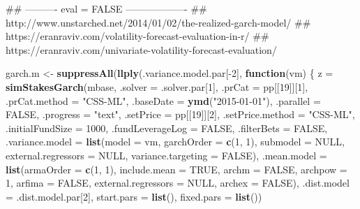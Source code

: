 \documentclass[]{tufte-book}
\newenvironment{Shaded}{}{}
\newcommand{\KeywordTok}[1]{\textcolor[rgb]{0.00,0.44,0.13}{\textbf{#1}}}
\newcommand{\DataTypeTok}[1]{\textcolor[rgb]{0.56,0.13,0.00}{#1}}
\newcommand{\DecValTok}[1]{\textcolor[rgb]{0.25,0.63,0.44}{#1}}
\newcommand{\StringTok}[1]{\textcolor[rgb]{0.25,0.44,0.63}{#1}}
\newcommand{\OtherTok}[1]{\textcolor[rgb]{0.00,0.44,0.13}{#1}}
\newcommand{\ControlFlowTok}[1]{\textcolor[rgb]{0.00,0.44,0.13}{\textbf{#1}}}
\newcommand{\OperatorTok}[1]{\textcolor[rgb]{0.40,0.40,0.40}{#1}}
\newcommand{\NormalTok}[1]{#1}
\begin{document}
\begin{Shaded}
\begin{Highlighting}[]
\NormalTok{## ---------- eval = FALSE -------------------}
\NormalTok{## http://www.unstarched.net/2014/01/02/the-realized-garch-model/}
\NormalTok{## https://eranraviv.com/volatility-forecast-evaluation-in-r/}
\NormalTok{## https://eranraviv.com/univariate-volatility-forecast-evaluation/}

\NormalTok{garch.m <-}\StringTok{ }\KeywordTok{suppressAll}\NormalTok{(}\KeywordTok{llply}\NormalTok{(.variance.model.par[}\OperatorTok{-}\DecValTok{2}\NormalTok{], }
    \ControlFlowTok{function}\NormalTok{(vm) \{}
\NormalTok{        z =}\StringTok{ }\KeywordTok{simStakesGarch}\NormalTok{(mbase, }\DataTypeTok{.solver =}\NormalTok{ .solver.par[}\DecValTok{1}\NormalTok{], }
            \DataTypeTok{.prCat =}\NormalTok{ pp[[}\DecValTok{19}\NormalTok{]][}\DecValTok{1}\NormalTok{], }\DataTypeTok{.prCat.method =} \StringTok{"CSS-ML"}\NormalTok{, }
            \DataTypeTok{.baseDate =} \KeywordTok{ymd}\NormalTok{(}\StringTok{"2015-01-01"}\NormalTok{), }\DataTypeTok{.parallel =} \OtherTok{FALSE}\NormalTok{, }
            \DataTypeTok{.progress =} \StringTok{"text"}\NormalTok{, }\DataTypeTok{.setPrice =}\NormalTok{ pp[[}\DecValTok{19}\NormalTok{]][}\DecValTok{2}\NormalTok{], }
            \DataTypeTok{.setPrice.method =} \StringTok{"CSS-ML"}\NormalTok{, }\DataTypeTok{.initialFundSize =} \DecValTok{1000}\NormalTok{, }
            \DataTypeTok{.fundLeverageLog =} \OtherTok{FALSE}\NormalTok{, }\DataTypeTok{.filterBets =} \OtherTok{FALSE}\NormalTok{, }
            \DataTypeTok{.variance.model =} \KeywordTok{list}\NormalTok{(}\DataTypeTok{model =}\NormalTok{ vm, }
                \DataTypeTok{garchOrder =} \KeywordTok{c}\NormalTok{(}\DecValTok{1}\NormalTok{, }\DecValTok{1}\NormalTok{), }\DataTypeTok{submodel =} \OtherTok{NULL}\NormalTok{, }
                \DataTypeTok{external.regressors =} \OtherTok{NULL}\NormalTok{, }\DataTypeTok{variance.targeting =} \OtherTok{FALSE}\NormalTok{), }
            \DataTypeTok{.mean.model =} \KeywordTok{list}\NormalTok{(}\DataTypeTok{armaOrder =} \KeywordTok{c}\NormalTok{(}\DecValTok{1}\NormalTok{, }
                \DecValTok{1}\NormalTok{), }\DataTypeTok{include.mean =} \OtherTok{TRUE}\NormalTok{, }\DataTypeTok{archm =} \OtherTok{FALSE}\NormalTok{, }
                \DataTypeTok{archpow =} \DecValTok{1}\NormalTok{, }\DataTypeTok{arfima =} \OtherTok{FALSE}\NormalTok{, }\DataTypeTok{external.regressors =} \OtherTok{NULL}\NormalTok{, }
                \DataTypeTok{archex =} \OtherTok{FALSE}\NormalTok{), }\DataTypeTok{.dist.model =}\NormalTok{ .dist.model.par[}\DecValTok{2}\NormalTok{], }
            \DataTypeTok{start.pars =} \KeywordTok{list}\NormalTok{(), }\DataTypeTok{fixed.pars =} \KeywordTok{list}\NormalTok{())}
        

\end{Highlighting}
\end{Shaded}
\end{document}
